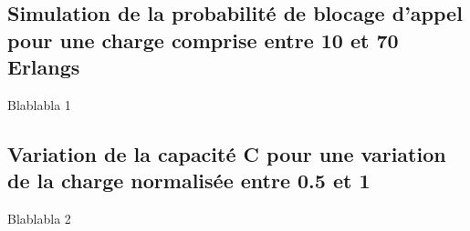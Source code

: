 %
        \subsection{Simulation de la probabilité de blocage d'appel pour une charge comprise entre 10 et 70 Erlangs}
Blablabla 1

%
        \subsection{Variation de la capacité C pour une variation de la charge normalisée entre 0.5 et 1}
Blablabla 2

%
